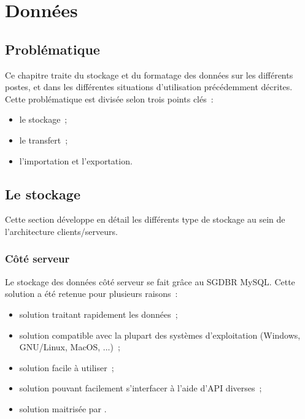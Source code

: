 \section{Données}\label{DonneesTechnique}
\label{Architecture_technique_des_donnees}

\newcommand{\Qt}{\href{http://qt-project.org/}{Qt}\xspace}

\subsection{Problématique}
Ce chapitre traite du stockage et du formatage des données sur les différents postes, et dans les différentes situations d'utilisation précédemment décrites.
\\
Cette problématique est divisée selon trois points clés~:
\begin{itemize}
	\item le stockage~;
	\item le transfert~;
	\item l'importation et l'exportation.
\end{itemize}

\subsection{Le stockage}
Cette section développe en détail les différents type de stockage au sein de l'architecture clients/serveurs.

\subsubsection{Côté serveur}
Le stockage des données côté serveur se fait grâce au SGDBR MySQL.
Cette solution a été retenue pour plusieurs raisons~:
\begin{itemize}
	\item solution traitant rapidement les données~;
	\item solution compatible avec la plupart des systèmes d'exploitation (Windows, GNU/Linux, MacOS, ...)~;
	\item solution facile à utiliser~;
	\item solution pouvant facilement s'interfacer à l'aide d'API diverses~;
	\item solution maitrisée par \mo.
\end{itemize}

